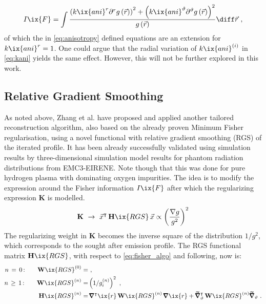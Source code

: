 %
            \begin{align}%
                I\ix{F}=\int\frac{%
                    \left(k\ix{ani}^{r}\partial^{r}g\left(\vec{r}\right)\right)^{2}+\left(k\ix{ani}^{\vartheta}\partial^{\vartheta}g\left(\vec{r}\right)\right)^{2}}{%
                    g\left(\vec{r}\right)}\diff\vec{r}\,\,,\nonumber%
            \end{align}%
%
            of which the in \cref{eq:anisotropy} defined equations are an extension for $k\ix{ani}^{r}=1$. One could argue that the radial variation of $k\ix{ani}^{\left(i\right)}$ in \cref{eq:kani} yields the same effect. However, this will not be further explored in this work.%
%
        \subsection{Relative Gradient Smoothing}\label{subsec:rgs}%
%
            As noted above, Zhang et al.\cite{Zhang2013,Zhang2021_2} have proposed and applied another tailored reconstruction algorithm, also based on the already proven\cite{Anton1996} Minimum Fisher regularisation, using a novel functional with relative gradient
            smoothing (RGS) of the iterated profile. It has been already successfully validated using simulation results by three-dimensional simulation model results for phantom radiation distributions from EMC3-EIRENE\cite{Zhang2021_2}. Note though that this was done for pure hydrogen plasma with dominating oxygen impurities. The idea is to modify the expression around the Fisher information $I\ix{F}$ after which the regularizing expression $\mathbf{K}$ is modelled.%
%
            \begin{align}%
                \mathbf{K}\,\,\to\,\,\vec{x}^{\intercal}\,\mathbf{H}\ix{RGS}\,\vec{x}\propto\left(\frac{\nabla g}{g^{2}}\right)^{2}%
            \end{align}\label{eq:baseRGS}%
%
            The regularizing weight in $\mathbf{K}$ becomes the inverse square of the distribution $1/g^{2}$, which corresponds to the sought after emission profile. The RGS functional matrix $\mathbf{H}\ix{RGS}$, with respect to \cref{eq:fisher_algo} and following, now is:%
%
            \begin{align}%
                \begin{split}%
                    n\,=\,0\,\text{:}\qquad\mathbf{W}\ix{RGS}^{\left(0\right)}=&\,\,,\\%
                    n\,\ge\,1\,\text{:}\qquad\mathbf{W}\ix{RGS}^{\left(n\right)}=&\left(1/g_{i}^{\left(n\right)}\right)^{2}\,\,,\\
                    \mathbf{H}\ix{RGS}^{\left(n\right)}=&\,\pmb{\nabla}^{\intercal}\ix{r}\,\mathbf{W}\ix{RGS}^{\left(n\right)}\,\pmb{\nabla}\ix{r}+\pmb{\widetilde{\nabla}}^{\intercal}_{\vartheta}\,\mathbf{W}\ix{RGS}^{\left(n\right)}\pmb{\widetilde{\nabla}}_{\vartheta}\,\,.%
                \end{split}%
            \end{align}%
